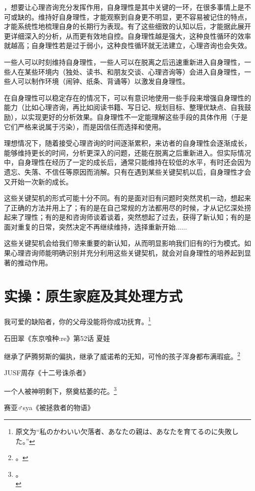 ，想要让心理咨询充分发挥作用，自身理性是其中关键的一环，在很多事情上是不可或缺的。维持好自身理性，才能观察到自身更不明显，更不容易被记住的特点，才能系统性地梳理自身的长期行为表现。有了这些细致的认知以后，才能据此展开更详细深入的分析，从而更有效地自控。自身理性越是强大，这种良性循环的效率就越高；自身理性若是过于弱小，这种良性循环就无法建立，心理咨询也会失效。
\begin{explain}
一些人可以时刻维持自身理性，一些人可以在脱离之后迅速重新进入自身理性，一些人在某些环境内（独处、读书、和朋友交谈、心理咨询等）会进入自身理性，一些人可以制作环境（闹钟、纸条、背诵等）以激发自身理性。

在自身理性可以稳定存在的情况下，可以有意识地使用一些手段来增强自身理性的能力（比如心理咨询，再比如阅读书籍、写日记、规划目标、整理优缺点、自我鼓励），以实现更好的分析效果。自身理性不一定能理解这些手段的具体作用（于是它们严格来说属于污染），而是因信任而选择和使用。

理想情况下，随着接受心理咨询的时间逐渐累积，来访者的自身理性会逐渐成长，能够维持更长的时间，分析更深入的问题，还能在脱离之后重新进入。但实际情况中，自身理性在经历了一定的成长后，通常只能维持在较低的水平，有时还会因为遗忘、失落、不信任等原因而消解。只有在遇到某些关键契机以后，自身理性才会又开始一次新的成长。%

这些关键契机的形式可能十分不同。有的是面对旧有问题时突然灵机一动，想起来了正确的方法并用上了；有的是在自己常规的方法都用尽的时候，才从记忆深处捞起来了理性；有的是和咨询师谈着谈着，突然想起了过去，获得了新认知；有的是面对重复的日常，突然决定不再继续维持，选择重新开始......

这些关键契机会给我们带来重要的新认知，从而明显影响我们旧有的行为模式。如果心理咨询师能明确识别并充分利用这些关键契机，就会对自身理性的培养起到显著的推动作用。
\end{explain}

\section{实操：原生家庭及其处理方式\label{sec:原生家庭}}
\hfill\begin{minipage}{0.65\textwidth}
\fontsize{8pt}{12pt}\selectfont\fontsize{8pt}{12pt}
\raggedright 我可爱的缺陷者，你的父母没能将你成功抚育。\footnote{原文为“私のかわいい欠落者、あなたの親は、あなたを育てるのに失敗した。”}

\raggedleft 石田翠《东京喰种:re》第52话 夏娃

\raggedright 继承了萨腾努斯的偏执，继承了威诺希的无知，可怜的孩子浑身都布满瑕疵。\footnote{\another{}。}

\raggedleft JUSF周存《十二号诛杀者》

\raggedright 一个人被神明剩下，祭奠枯萎的花。\footnote{。\\}

\raggedleft 赛亚♂sya《被拯救者的物语》
\end{minipage}

